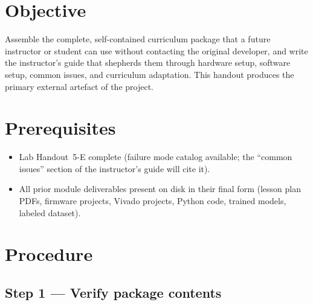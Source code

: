 \documentclass[11pt,letterpaper]{article}
\begin{document}

\section{Objective}
Assemble the complete, self-contained curriculum package that a future instructor or student can use without contacting the original developer, and write the instructor's guide that shepherds them through hardware setup, software setup, common issues, and curriculum adaptation. This handout produces the primary external artefact of the project.

\section{Prerequisites}
\begin{itemize}[leftmargin=2em]
	\item Lab Handout~5-E complete (failure mode catalog available; the ``common issues'' section of the instructor's guide will cite it).
	\item All prior module deliverables present on disk in their final form (lesson plan PDFs, firmware projects, Vivado projects, Python code, trained models, labeled dataset).
\end{itemize}

\section{Procedure}

\subsection{Step 1 --- Verify package contents}
\end{document}
